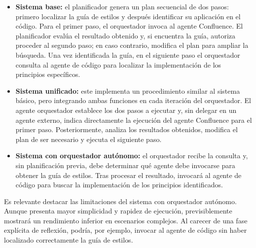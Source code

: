 \begin{itemize}

\item\textbf{Sistema base: } el planificador genera un plan secuencial de dos pasos: primero localizar la guía de estilos y después identificar su aplicación en el código. Para el primer paso, el orquestador invoca al agente Confluence. El planificador evalúa el resultado obtenido y, si encuentra la guía, autoriza proceder al segundo paso; en caso contrario, modifica el plan para ampliar la búsqueda. Una vez identificada la guía, en el siguiente paso el orquestador consulta al agente de código para localizar la implementación de los principios específicos.

\item\textbf{Sistema unificado:} este implementa un procedimiento similar al sistema básico, pero integrando ambas funciones en cada iteración del orquestador. El agente orquestador establece los dos pasos a ejecutar y, sin delegar en un agente externo, indica directamente la ejecución del agente Confluence para el primer paso. Posteriormente, analiza los resultados obtenidos, modifica el plan de ser necesario y ejecuta el siguiente paso.

\item\textbf{Sistema con orquestador autónomo:} el orquestador recibe la consulta y, sin planificación previa, debe determinar qué agente debe invocarse para obtener la guía de estilos. Tras procesar el resultado, invocará al agente de código para buscar la implementación de los principios identificados.
\end{itemize}

Es relevante destacar las limitaciones del sistema con orquestador autónomo. Aunque presenta mayor simplicidad y rapidez de ejecución, previsiblemente mostrará un rendimiento inferior en escenarios complejos. Al carecer de una fase explícita de reflexión, podría, por ejemplo, invocar al agente de código sin haber localizado correctamente la guía de estilos.
